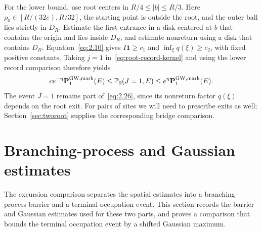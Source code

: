 \documentclass[11pt,letterpaper,reqno]{amsart}
\numberwithin{equation}{section}
\theoremstyle{remark}
\begin{document}
For the lower bound, use root centers in $R/4\le|b|\le R/3$. Here $\rho_0\in[R/(32e),R/32]$, the starting point is outside the root, and the outer ball lies strictly in $D_R$. Estimate the first entrance in a disk centered at $b$ that contains the origin and lies inside $D_R$, and estimate nonreturn using a disk that contains $D_R$. Equation~\eqref{eq:2.10} gives $I\mathbf1\ge c_1$ and $\inf_\xi q(\xi)\ge c_2$, with fixed positive constants. Taking $j=1$ in~\eqref{eq:root-record-kernel} and using the lower record comparison therefore yields
\begin{equation}\label{eq:2.26}
c e^{-\eta}\mathbf P_1^{\rm GW,mark}(E)
\le\mathbb P_0(J=1,E)
\le e^\eta\mathbf P_1^{\rm GW,mark}(E).
\end{equation}
The event $J=1$ remains part of~\eqref{eq:2.26}, since its nonreturn factor $q(\xi)$ depends on the root exit. For pairs of sites we will need to prescribe exits as well; Section~\ref{sec:tworoot} supplies the corresponding bridge comparison.



\section{Branching-process and Gaussian estimates}\label{sec:tools}
The excursion comparison separates the spatial estimates into a branching-process barrier and a terminal occupation event. This section records the barrier and Gaussian estimates used for these two parts, and proves a comparison that bounds the terminal occupation event by a shifted Gaussian maximum.
\end{document}
